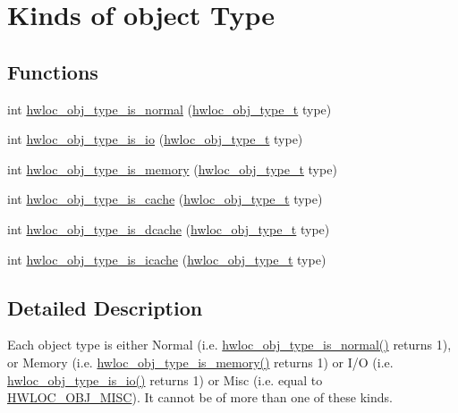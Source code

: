 \hypertarget{a00198}{}\section{Kinds of object Type}
\label{a00198}
\subsection*{Functions}
\begin{DoxyCompactItemize}
\item 
int \hyperlink{a00198_ga52ef38431eba383b048b98c669b59a16}{hwloc\+\_\+obj\+\_\+type\+\_\+is\+\_\+normal} (\hyperlink{a00184_gacd37bb612667dc437d66bfb175a8dc55}{hwloc\+\_\+obj\+\_\+type\+\_\+t} type)
\item 
int \hyperlink{a00198_gac8a954ed37a4376097234c828068cbef}{hwloc\+\_\+obj\+\_\+type\+\_\+is\+\_\+io} (\hyperlink{a00184_gacd37bb612667dc437d66bfb175a8dc55}{hwloc\+\_\+obj\+\_\+type\+\_\+t} type)
\item 
int \hyperlink{a00198_ga1d074390c8a3dc3088d84f73fb73f966}{hwloc\+\_\+obj\+\_\+type\+\_\+is\+\_\+memory} (\hyperlink{a00184_gacd37bb612667dc437d66bfb175a8dc55}{hwloc\+\_\+obj\+\_\+type\+\_\+t} type)
\item 
int \hyperlink{a00198_ga2ed589bea28711e80b92066510a5607d}{hwloc\+\_\+obj\+\_\+type\+\_\+is\+\_\+cache} (\hyperlink{a00184_gacd37bb612667dc437d66bfb175a8dc55}{hwloc\+\_\+obj\+\_\+type\+\_\+t} type)
\item 
int \hyperlink{a00198_ga395e48cd221d107e5891689624e1aec4}{hwloc\+\_\+obj\+\_\+type\+\_\+is\+\_\+dcache} (\hyperlink{a00184_gacd37bb612667dc437d66bfb175a8dc55}{hwloc\+\_\+obj\+\_\+type\+\_\+t} type)
\item 
int \hyperlink{a00198_ga8abcee67b9b074332c1866405a3648a9}{hwloc\+\_\+obj\+\_\+type\+\_\+is\+\_\+icache} (\hyperlink{a00184_gacd37bb612667dc437d66bfb175a8dc55}{hwloc\+\_\+obj\+\_\+type\+\_\+t} type)
\end{DoxyCompactItemize}


\subsection{Detailed Description}
Each object type is either Normal (i.\+e. \hyperlink{a00198_ga52ef38431eba383b048b98c669b59a16}{hwloc\+\_\+obj\+\_\+type\+\_\+is\+\_\+normal()} returns 1), or Memory (i.\+e. \hyperlink{a00198_ga1d074390c8a3dc3088d84f73fb73f966}{hwloc\+\_\+obj\+\_\+type\+\_\+is\+\_\+memory()} returns 1) or I/O (i.\+e. \hyperlink{a00198_gac8a954ed37a4376097234c828068cbef}{hwloc\+\_\+obj\+\_\+type\+\_\+is\+\_\+io()} returns 1) or Misc (i.\+e. equal to \hyperlink{a00184_ggacd37bb612667dc437d66bfb175a8dc55a19f8a6953fa91efc76bcbcdf2d22de4d}{H\+W\+L\+O\+C\+\_\+\+O\+B\+J\+\_\+\+M\+I\+SC}). It cannot be of more than one of these kinds. 

